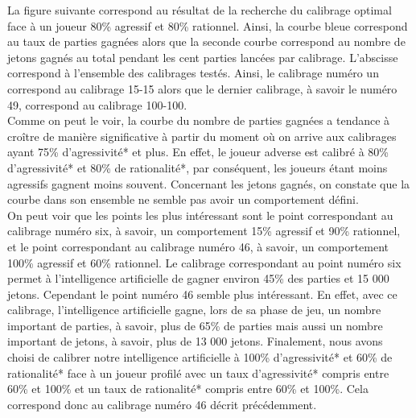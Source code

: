 \documentclass{report}
\begin{document}
La figure suivante correspond au résultat de la recherche du calibrage optimal face à un joueur 80\% agressif et 80\% rationnel. Ainsi, la courbe bleue correspond au taux de parties gagnées alors que la seconde courbe correspond au nombre de jetons gagnés au total pendant les cent parties lancées par calibrage. L'abscisse correspond à l'ensemble des calibrages testés. Ainsi, le calibrage numéro un correspond au calibrage 15-15 alors que le dernier calibrage, à savoir le numéro 49, correspond au calibrage 100-100.\\

Comme on peut le voir, la courbe du nombre de parties gagnées a tendance à croître de manière significative à partir du moment où on arrive aux calibrages ayant 75\% d'agressivité* et plus. En effet, le joueur adverse est calibré à 80\% d'agressivité* et 80\% de rationalité*, par conséquent, les joueurs étant moins agressifs gagnent moins souvent. Concernant les jetons gagnés, on constate que la courbe dans son ensemble ne semble pas avoir un comportement défini.\\

On peut voir que les points les plus intéressant sont le point correspondant au calibrage numéro six, à savoir, un comportement 15\% agressif et 90\% rationnel, et le point correspondant au calibrage numéro 46, à savoir, un comportement 100\% agressif et 60\% rationnel. Le calibrage correspondant au point numéro six permet à l'intelligence artificielle de gagner environ 45\% des parties et 15 000 jetons. Cependant le point numéro 46 semble plus intéressant. En effet, avec ce calibrage, l'intelligence artificielle gagne, lors de sa phase de jeu, un nombre important de parties, à savoir, plus de 65\% de parties mais aussi un nombre important de jetons, à savoir, plus de 13 000 jetons. Finalement, nous avons choisi de calibrer notre intelligence artificielle à 100\% d'agressivité* et 60\% de rationalité* face à un joueur profilé avec un taux d'agressivité* compris entre 60\% et 100\% et un taux de rationalité* compris entre 60\% et 100\%. Cela correspond donc au calibrage numéro 46 décrit précédemment. \par
\end{document}
